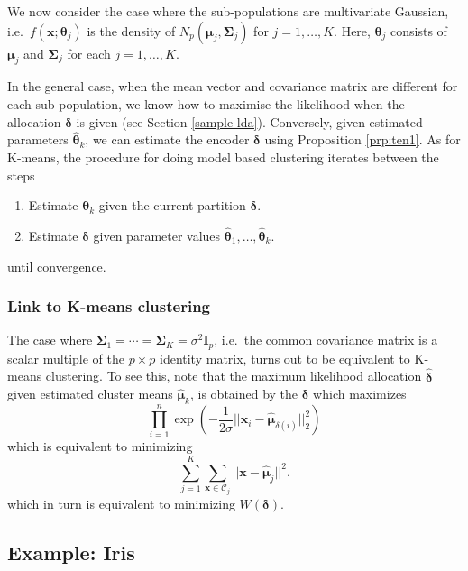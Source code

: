 \documentclass[
]{book}
\theoremstyle{definition}
\theoremstyle{definition}
\theoremstyle{definition}
\theoremstyle{definition}
\theoremstyle{remark}
\begin{document}
We now consider the case where the sub-populations are multivariate Gaussian, i.e.~\(f(\mathbf x; \boldsymbol \theta_j)\) is the density of \(N_p({\boldsymbol{\mu}}_j, \boldsymbol{\Sigma}_j)\) for \(j=1, \ldots , K\). Here, \(\boldsymbol \theta_j\) consists of \({\boldsymbol{\mu}}_j\) and \(\boldsymbol{\Sigma}_j\) for each \(j=1, \ldots , K\).

In the general case, when the mean vector and covariance matrix are different for each sub-population, we know how to maximise the likelihood when the allocation \(\boldsymbol \delta\) is given (see Section \ref{sample-lda}). Conversely, given estimated parameters \(\hat{\boldsymbol \theta}_k\), we can estimate the encoder \(\boldsymbol \delta\) using Proposition \ref{prp:ten1}. As for K-means, the procedure for doing model based clustering iterates between the steps

\begin{enumerate}
\def\labelenumi{\arabic{enumi}.}
\item
  Estimate \(\boldsymbol \theta_k\) given the current partition \(\boldsymbol \delta\).
\item
  Estimate \(\boldsymbol \delta\) given parameter values \(\hat{\boldsymbol \theta}_1, \ldots, \hat{\boldsymbol \theta}_k\).
\end{enumerate}

until convergence.

\subsubsection{Link to K-means clustering}\label{link-to-k-means-clustering}

The case where \(\boldsymbol{\Sigma}_1=\cdots = \boldsymbol{\Sigma}_K=\sigma^2 \mathbf I_p\), i.e.~the common covariance matrix is a scalar multiple of the \(p \times p\) identity matrix, turns out to be equivalent to K-means clustering. To see this, note that the maximum likelihood allocation \(\hat{\boldsymbol \delta}\) given estimated cluster means \(\hat{{\boldsymbol{\mu}}}_k\), is obtained by the \(\boldsymbol \delta\) which maximizes
\[
\prod_{i=1}^n\exp(-\frac{1}{2\sigma}||\mathbf x_i-\hat{{\boldsymbol{\mu}}}_{\delta(i)}||_2^2)
\]
which is equivalent to minimizing
\[
\sum_{j=1}^K \sum_{\mathbf x\in \mathcal{C}_j} \vert \vert \mathbf x- \hat{{\boldsymbol{\mu}}}_j\vert \vert^2.
\]
which in turn is equivalent to minimizing \(W(\boldsymbol \delta)\).

\subsection{Example: Iris}\label{example-iris-1}
\end{document}
